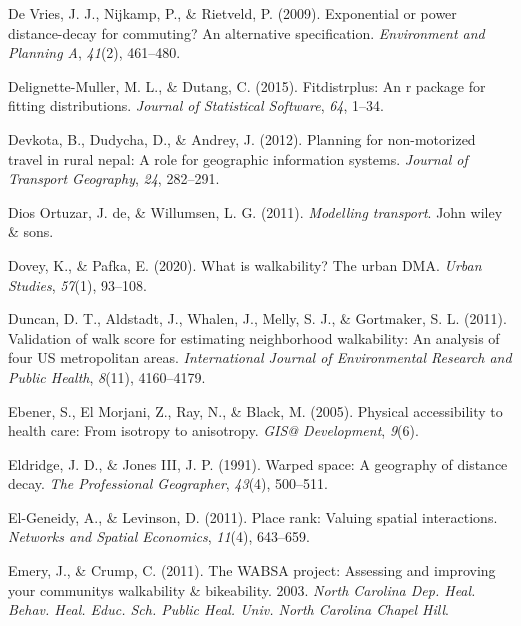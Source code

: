 \documentclass[
11pt, %
oneside, %
english, %
singlespacing, %
]{macthesis} %
\newlength{\cslhangindent}
\newenvironment{CSLReferences}[2] %
{\begin{list}{}{%
	\setlength{\itemindent}{0pt}
	\setlength{\leftmargin}{0pt}
	\setlength{\parsep}{0pt}
	\ifodd #1
	\setlength{\leftmargin}{\cslhangindent}
	\setlength{\itemindent}{-1\cslhangindent}
	\fi
	\setlength{\itemsep}{#2\baselineskip}}}
{\end{list}}
\begin{document}
\begin{CSLReferences}{1}{0}
De Vries, J. J., Nijkamp, P., \& Rietveld, P. (2009). Exponential or power distance-decay for commuting? An alternative specification. \emph{Environment and Planning A}, \emph{41}(2), 461--480.

Delignette-Muller, M. L., \& Dutang, C. (2015). Fitdistrplus: An r package for fitting distributions. \emph{Journal of Statistical Software}, \emph{64}, 1--34.

Devkota, B., Dudycha, D., \& Andrey, J. (2012). Planning for non-motorized travel in rural nepal: A role for geographic information systems. \emph{Journal of Transport Geography}, \emph{24}, 282--291.

Dios Ortuzar, J. de, \& Willumsen, L. G. (2011). \emph{Modelling transport}. John wiley \& sons.

Dovey, K., \& Pafka, E. (2020). What is walkability? The urban DMA. \emph{Urban Studies}, \emph{57}(1), 93--108.

Duncan, D. T., Aldstadt, J., Whalen, J., Melly, S. J., \& Gortmaker, S. L. (2011). Validation of walk score for estimating neighborhood walkability: An analysis of four US metropolitan areas. \emph{International Journal of Environmental Research and Public Health}, \emph{8}(11), 4160--4179.

Ebener, S., El Morjani, Z., Ray, N., \& Black, M. (2005). Physical accessibility to health care: From isotropy to anisotropy. \emph{GIS@ Development}, \emph{9}(6).

Eldridge, J. D., \& Jones III, J. P. (1991). Warped space: A geography of distance decay. \emph{The Professional Geographer}, \emph{43}(4), 500--511.

El-Geneidy, A., \& Levinson, D. (2011). Place rank: Valuing spatial interactions. \emph{Networks and Spatial Economics}, \emph{11}(4), 643--659.

Emery, J., \& Crump, C. (2011). The WABSA project: Assessing and improving your communitys walkability \& bikeability. 2003. \emph{North Carolina Dep. Heal. Behav. Heal. Educ. Sch. Public Heal. Univ. North Carolina Chapel Hill}.


\end{CSLReferences}
\end{document}
